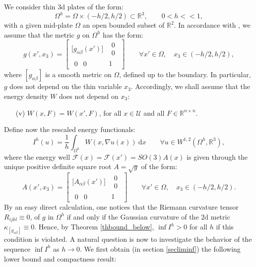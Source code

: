 \documentclass[leqno,twoside, 11pt]{amsart}
\theoremstyle{plain}
\theoremstyle{definition}
\numberwithin{equation}{section}
\numberwithin{figure}{section}
\begin{document}
\medskip

We consider thin $3$d plates of the form:
$$\Omega^h = \Omega\times (-h/2, h/2)\subset \mathbb{R}^3, \qquad 0<h< <1,$$
with a given mid-plate  $\Omega$ an open bounded subset of $\mathbb{R}^2$.
In accordance with \cite{klein}, we assume that the metric $g$ on
$\Omega^h$ has the form:
\begin{equation}\label{metryka}
g(x', x_3) = \left[\begin{array}{cc} \Big[g_{\alpha\beta}(x')\Big] &
\begin{array}{c} 0 \\ 0\end{array}\\
\begin{array}{cc} 0 & 0 \end{array} & 1
\end{array}\right] \qquad \forall x'\in\Omega, \quad x_3\in (-h/2, h/2),
\end{equation}
where $[g_{\alpha\beta}]$ is a smooth metric on $\Omega$, defined up to
the boundary.  In particular, $g$ does not depend on the thin variable $x_3$.
Accordingly, we shall assume that the energy density $W$ does not depend on $x_3$:
\begin{itemize}
\item[(v)] $W(x,F) = W(x',F)$, for all $x\in\mathcal{U}$ and 
all $F\in\mathbb{R}^{n\times n}$.
\end{itemize}

\medskip

Define now the rescaled energy functionals:
$$I^h(u) = \frac{1}{h}\int_{\Omega^h} W(x, \nabla u(x))~\mbox{d}x 
\qquad \forall u\in W^{1,2}(\Omega^h,\mathbb{R}^3),$$
where the energy well $\mathcal{F}(x) = \mathcal{F}(x') = SO(3) A(x)$
is given through the unique positive definite square root $A=\sqrt{g}$
of the form:
\begin{equation*}
A(x', x_3) = \left[\begin{array}{cc} \Big[A_{\alpha\beta}(x')\Big] &
\begin{array}{c} 0 \\ 0\end{array}\\
\begin{array}{cc} 0 & 0 \end{array} & 1
\end{array}\right] \qquad \forall x'\in\Omega, \quad x_3\in (-h/2, h/2).
\end{equation*}
By an easy direct calculation, one notices that the Riemann curvature tensor
$R_{ijkl} \equiv 0$, of $g$ in $\Omega^h$ if and only if the Gaussian curvature
of the $2$d metric $\kappa_{[g_{\alpha\beta}]}\equiv 0$. 
Hence, by Theorem \ref{thbound_below}, 
$\inf I^h>0$ for all $h$ if this condition is violated.
A natural question is now to investigate the behavior of the sequence  $\inf
I^h$ as $h\to 0$.
We first obtain (in section \ref{secliminf}) the following lower bound
and compactness result:
\end{document}
